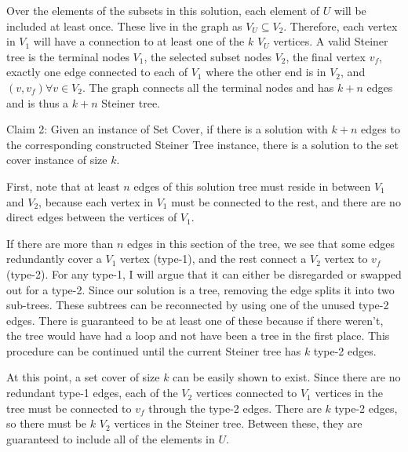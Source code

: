 \documentclass{article}
\begin{document}
Over the elements of the subsets in this solution, each element of $U$ will be
included at least once. These live in the graph as $V_U \subseteq V_2$.
Therefore, each vertex in $V_1$ will have a connection to at least one of the
$k$ $V_U$ vertices. A valid Steiner tree is the terminal nodes $V_1$, the
selected subset nodes $V_2$, the final vertex $v_f$, exactly one edge
connected to each of $V_1$ where the other end is in $V_2$, and $(v, v_f)
\forall v \in V_2$. The graph connects all the terminal nodes and has $k+n$
edges and is thus a $k+n$ Steiner tree.

Claim 2: Given an instance of Set Cover, if there is a solution with $k+n$
edges to the corresponding constructed Steiner Tree instance, there is a
solution to the set cover instance of size $k$.

First, note that at least $n$ edges of this solution tree must reside in
between $V_1$ and $V_2$, because each vertex in $V_1$ must be connected to the
rest, and there are no direct edges between the vertices of $V_1$.

If there are more than $n$ edges in this section of the tree, we see that some
edges redundantly cover a $V_1$ vertex (type-1), and the rest connect a $V_2$
vertex to $v_f$ (type-2). For any type-1, I will argue that it can either be
disregarded or swapped out for a type-2. Since our solution is a tree,
removing the edge splits it into two sub-trees. These subtrees can be
reconnected by using one of the unused type-2 edges. There is guaranteed to be
at least one of these because if there weren't, the tree would have had a loop
and not have been a tree in the first place. This procedure can be continued
until the current Steiner tree has $k$ type-2 edges.

At this point, a set cover of size $k$ can be easily shown to exist. Since
there are no redundant type-1 edges, each of the $V_2$ vertices connected to
$V_1$ vertices in the tree must be connected to $v_f$ through the type-2
edges. There are $k$ type-2 edges, so there must be $k$ $V_2$ vertices in the
Steiner tree. Between these, they are guaranteed to include all of the
elements in $U$.
\end{document}
